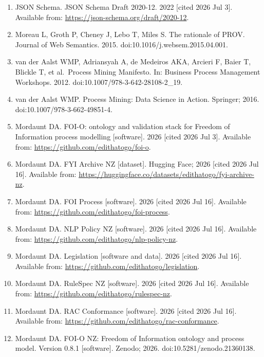 \documentclass[
]{article}
\begin{document}
\begin{enumerate}
\hypertarget{ref-19}{}
\item
  JSON Schema. JSON Schema Draft 2020-12. 2022 {[}cited 2026 Jul 3{]}.
  Available from: \url{https://json-schema.org/draft/2020-12}.
\hypertarget{ref-20}{}
\item
  Moreau L, Groth P, Cheney J, Lebo T, Miles S. The rationale of PROV.
  Journal of Web Semantics. 2015. doi:10.1016/j.websem.2015.04.001.
\hypertarget{ref-21}{}
\item
  van der Aalst WMP, Adriansyah A, de Medeiros AKA, Arcieri F, Baier T,
  Blickle T, et al.~Process Mining Manifesto. In: Business Process
  Management Workshops. 2012. doi:10.1007/978-3-642-28108-2\_19.
\hypertarget{ref-22}{}
\item
  van der Aalst WMP. Process Mining: Data Science in Action. Springer;
  2016. doi:10.1007/978-3-662-49851-4.
\hypertarget{ref-23}{}
\item
  Mordaunt DA. FOI-O: ontology and validation stack for Freedom of
  Information process modelling {[}software{]}. 2026 {[}cited 2026 Jul
  3{]}. Available from: \url{https://github.com/edithatogo/foi-o}.
\hypertarget{ref-24}{}
\item
  Mordaunt DA. FYI Archive NZ {[}dataset{]}. Hugging Face; 2026 {[}cited
  2026 Jul 16{]}. Available from:
  \url{https://huggingface.co/datasets/edithatogo/fyi-archive-nz}.
\hypertarget{ref-25}{}
\item
  Mordaunt DA. FOI Process {[}software{]}. 2026 {[}cited 2026 Jul 16{]}.
  Available from: \url{https://github.com/edithatogo/foi-process}.
\hypertarget{ref-26}{}
\item
  Mordaunt DA. NLP Policy NZ {[}software{]}. 2026 {[}cited 2026 Jul
  16{]}. Available from:
  \url{https://github.com/edithatogo/nlp-policy-nz}.
\hypertarget{ref-27}{}
\item
  Mordaunt DA. Legislation {[}software and data{]}. 2026 {[}cited 2026
  Jul 16{]}. Available from:
  \url{https://github.com/edithatogo/legislation}.
\hypertarget{ref-28}{}
\item
  Mordaunt DA. RuleSpec NZ {[}software{]}. 2026 {[}cited 2026 Jul 16{]}.
  Available from: \url{https://github.com/edithatogo/rulespec-nz}.
\hypertarget{ref-29}{}
\item
  Mordaunt DA. RAC Conformance {[}software{]}. 2026 {[}cited 2026 Jul
  16{]}. Available from:
  \url{https://github.com/edithatogo/rac-conformance}.
\hypertarget{ref-30}{}
\item
  Mordaunt DA. FOI-O NZ: Freedom of Information ontology and process
  model. Version 0.8.1 {[}software{]}. Zenodo; 2026.
  doi:10.5281/zenodo.21360138.
\end{enumerate}
\end{document}
